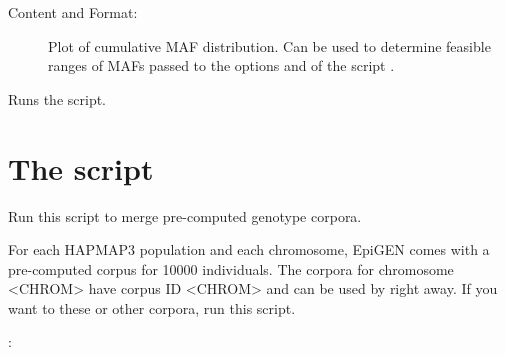 \documentclass[a4paper,10pt,english]{sphinxhowto}
\begin{document}
\begin{description}
\begin{description}
\begin{description}
\item[{Content and Format:}] \leavevmode
Plot of cumulative MAF distribution. Can be used to determine feasible ranges of MAFs passed to the options
 and  of the script .

\end{description}

\end{description}

\end{description}

\begin{fulllineitems}
\label{\detokenize{generate_genotype_corpus:generate_genotype_corpus.run_script}}
Runs the script.

\end{fulllineitems}



\section{The script }
\label{\detokenize{merge_genotype_corpora:module-merge_genotype_corpora}}\label{\detokenize{merge_genotype_corpora:the-script-merge-genotype-corpora-py}}\label{\detokenize{merge_genotype_corpora::doc}}
Run this script to merge pre-computed genotype corpora.

For each HAPMAP3 population and each chromosome, EpiGEN comes with a pre-computed corpus for 10000 individuals.
The corpora for chromosome \textless{}CHROM\textgreater{} have corpus ID \textless{}CHROM\textgreater{} and can be used by  right away.
If you want to these or other corpora, run this script.

:
\end{document}
